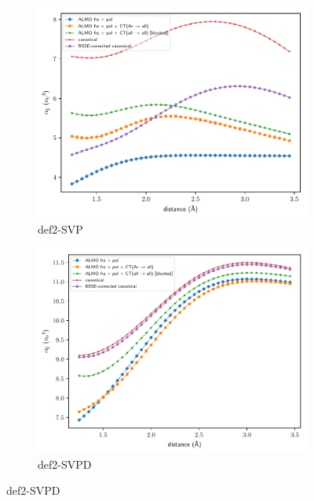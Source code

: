 \documentclass[xcolor=usenames,dvipsnames,svgnames]{beamer}
\begin{document}
\begin{frame}
  \begin{figure}
    \centering
    \begin{subfigure}[b]{0.49\linewidth}
      \includegraphics[width=\linewidth,keepaspectratio]{../paper_04/almo_vs_bsse_canonical_onaxis_projected_short_def2-SVP.pdf}
      \caption*{\scriptsize def2-SVP}
    \end{subfigure}
    \begin{subfigure}[b]{0.49\linewidth}
      \includegraphics[width=\linewidth,keepaspectratio]{../paper_04/almo_vs_bsse_canonical_onaxis_projected_short_def2-SVPD.pdf}
      \caption*{\scriptsize def2-SVPD}
    \end{subfigure}
  \end{figure}
\end{frame}
\end{document}
